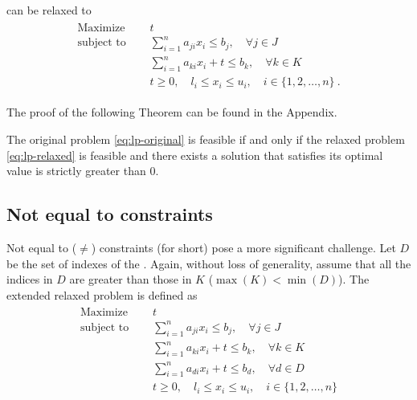 \documentclass[runningheads]{llncs}
\begin{document}
can be relaxed to
\begin{align}
    \label{eq:lp-relaxed}
    \begin{split}
        \text{Maximize }   \quad & t                                                             \\
        \text{subject to } \quad & \sum_{i=1}^{n} a_{ji}x_{i} \le b_j, \quad \forall j \in J     \\
        \quad                    & \sum_{i=1}^{n} a_{ki}x_{i} + t \le b_k, \quad \forall k \in K \\
        & t \ge 0, \quad l_i \le x_i \le u_i,  \quad i \in \{1, 2, \ldots, n\} \ .
    \end{split}
\end{align}

The proof of the following Theorem can be found in the Appendix.
\begin{theorem}
    \label{thm:lp-relaxed}
    The original problem \eqref{eq:lp-original} is feasible if and only if the relaxed problem \eqref{eq:lp-relaxed} is feasible and there exists a solution that satisfies its optimal value is strictly greater than $0$.
\end{theorem}

\subsection{Not equal to constraints}

Not equal to ($\ne$) constraints (\nqcs for short) pose a more significant challenge.
Let $D$ be the set of indexes of the \nqcs.
Again, without loss of generality, assume that all the indices in $D$ are greater than those in $K$ ($\max(K) < \min(D)$).
The extended relaxed problem is defined as
\begin{align}
    \label{eq:lp-extended}
    \begin{split}
        \text{Maximize }   \quad & t                                                             \\
        \text{subject to } \quad & \sum_{i=1}^{n} a_{ji}x_{i} \le b_j, \quad \forall j \in J     \\
        \quad                    & \sum_{i=1}^{n} a_{ki}x_{i} + t \le b_k, \quad \forall k \in K \\
        \quad                    & \sum_{i=1}^{n} a_{di}x_{i} + t \le b_d, \quad \forall d \in D \\
        & t \ge 0, \quad l_i \le x_i \le u_i,  \quad i \in \{1, 2, \ldots, n\}
    \end{split}
\end{align}
\end{document}
